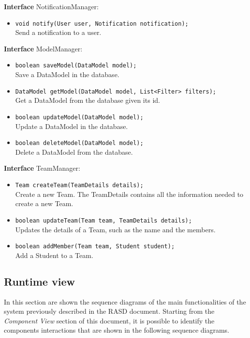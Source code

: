 \textbf{Interface} NotificationManager:
\begin{itemize}
    \item \texttt{void notify(User user, Notification notification);}
    \\ Send a notification to a user.
\end{itemize}

\textbf{Interface} ModelManager:
\begin{itemize}
    \item \texttt{boolean saveModel(DataModel model);}
    \\ Save a DataModel in the database.
    \item \texttt{DataModel getModel(DataModel model, List<Filter> filters);}
    \\ Get a DataModel from the database given its id.
    \item \texttt{boolean updateModel(DataModel model);}
    \\ Update a DataModel in the database.
    \item \texttt{boolean deleteModel(DataModel model);}
    \\ Delete a DataModel from the database.
\end{itemize}

\textbf{Interface} TeamManager:
\begin{itemize}
    \item \texttt{Team createTeam(TeamDetails details);}
    \\ Create a new Team. The TeamDetails contains all the information needed to create a new Team.
    \item \texttt{boolean updateTeam(Team team, TeamDetails details);}
    \\ Updates the details of a Team, such as the name and the members.
    \item \texttt{boolean addMember(Team team, Student student);}
    \\ Add a Student to a Team.
\end{itemize}
\subsection{Runtime view}
In this section are shown the sequence diagrams of the main functionalities of the system previously described in the RASD document. Starting from the \textit{Component View} section of this document, it is possible to identify the components interactions that are shown in the following sequence diagrams.
